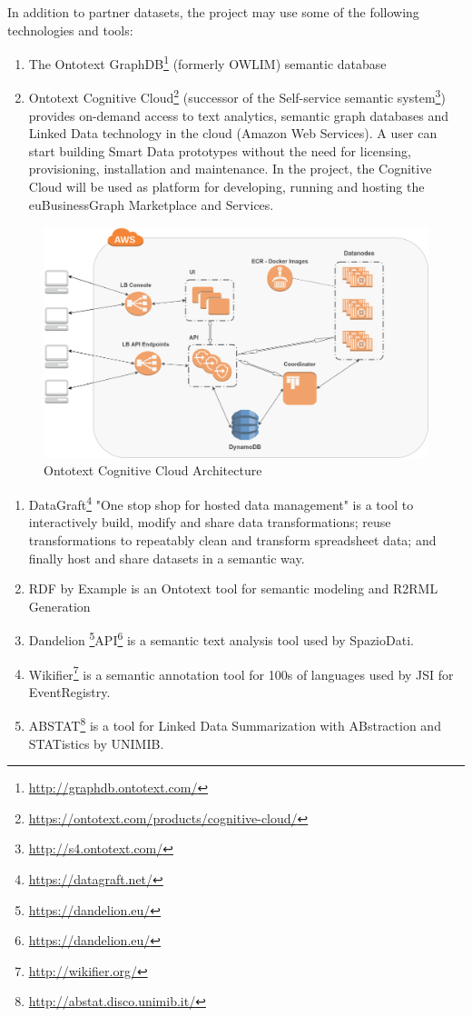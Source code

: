\documentclass[runningheads,a4paper]{llncs}
\makeatletter
\def\maxwidth#1{\ifdim\Gin@nat@width>#1 #1\else\Gin@nat@width\fi}
\makeatother
\begin{document}
In addition to partner datasets, the project may use some of the following technologies and tools:
\begin{enumerate}
\item The Ontotext GraphDB\footnote{\url{http://graphdb.ontotext.com/}} (formerly OWLIM) semantic database  \cite{_Ref491415452}
\item Ontotext Cognitive Cloud\footnote{\url{https://ontotext.com/products/cognitive-cloud/}} (successor of the Self-service semantic system\footnote{\url{http://s4.ontotext.com/}}) provides on-demand access to text analytics, semantic graph databases and Linked Data technology in the cloud (Amazon Web Services). A user can start building Smart Data prototypes without the need for licensing, provisioning, installation and maintenance. In the project, the Cognitive Cloud will be used as platform for developing, running and hosting the euBusinessGraph Marketplace and Services. 
\end{enumerate}
\begin{figure}[h!]
\centering
\includegraphics[width=\maxwidth{\textwidth}]{img/100002010000040A0000026E32942332B6CAF0DA.png}
\cprotect\caption{Ontotext Cognitive Cloud Architecture}
\label{}
\end{figure}

\begin{enumerate}
\item DataGraft\footnote{\url{https://datagraft.net/}} \cite{__RefNumPara__7260_1562275339} \cite{_Ref491437414} "One stop shop for hosted data management" is a tool to interactively build, modify and share data transformations; reuse transformations to repeatably clean and transform spreadsheet data; and finally host and share datasets in a semantic way. 
\item RDF by Example  \cite{_Ref491433543} is an Ontotext tool for semantic modeling and R2RML Generation
\item Dandelion \footnote{\url{https://dandelion.eu/}}API\footnote{\url{https://dandelion.eu/}} is a semantic text analysis tool used by SpazioDati.
\item Wikifier\footnote{\url{http://wikifier.org/}} is a semantic annotation tool for 100s of languages used by JSI for EventRegistry.
\item ABSTAT\footnote{\url{http://abstat.disco.unimib.it/}} is a tool for Linked Data Summarization with ABstraction and STATistics by UNIMIB.
\end{enumerate}
\end{document}
